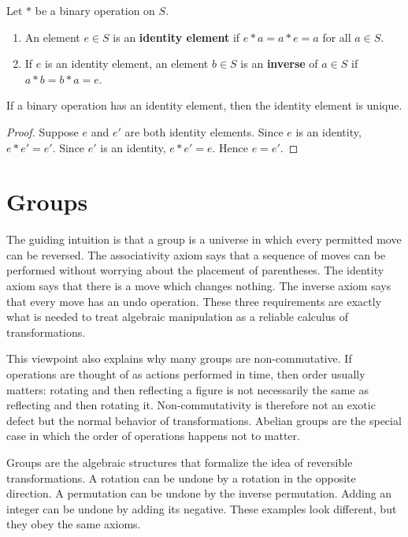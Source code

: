 \begin{definition}
Let $*$ be a binary operation on $S$.
\begin{enumerate}
    \item An element $e\in S$ is an \textbf{identity element} if $e*a=a*e=a$ for all $a\in S$.
    \item If $e$ is an identity element, an element $b\in S$ is an \textbf{inverse} of $a\in S$ if $a*b=b*a=e$.
\end{enumerate}
\end{definition}

\begin{proposition}
If a binary operation has an identity element, then the identity element is unique.
\end{proposition}

\begin{proof}
Suppose $e$ and $e'$ are both identity elements. Since $e$ is an identity, $e*e'=e'$. Since $e'$ is an identity, $e*e'=e$. Hence $e=e'$.
\end{proof}

\section{Groups}


The guiding intuition is that a group is a universe in which every permitted move can be reversed. The associativity axiom says that a sequence of moves can be performed without worrying about the placement of parentheses. The identity axiom says that there is a move which changes nothing. The inverse axiom says that every move has an undo operation. These three requirements are exactly what is needed to treat algebraic manipulation as a reliable calculus of transformations.

This viewpoint also explains why many groups are non-commutative. If operations are thought of as actions performed in time, then order usually matters: rotating and then reflecting a figure is not necessarily the same as reflecting and then rotating it. Non-commutativity is therefore not an exotic defect but the normal behavior of transformations. Abelian groups are the special case in which the order of operations happens not to matter.

Groups are the algebraic structures that formalize the idea of reversible transformations. A rotation can be undone by a rotation in the opposite direction. A permutation can be undone by the inverse permutation. Adding an integer can be undone by adding its negative. These examples look different, but they obey the same axioms.

